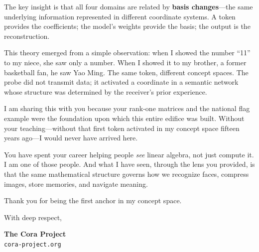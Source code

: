 \documentclass[11pt, a4paper]{article}
\begin{document}
The key insight is that all four domains are related by \textbf{basis changes}---the same underlying information represented in different coordinate systems. A token provides the coefficients; the model's weights provide the basis; the output is the reconstruction.

This theory emerged from a simple observation: when I showed the number ``11'' to my niece, she saw only a number. When I showed it to my brother, a former basketball fan, he saw Yao Ming. The same token, different concept spaces. The probe did not transmit data; it activated a coordinate in a semantic network whose structure was determined by the receiver's prior experience.

I am sharing this with you because your rank-one matrices and the national flag example were the foundation upon which this entire edifice was built. Without your teaching---without that first token activated in my concept space fifteen years ago---I would never have arrived here.

You have spent your career helping people \textit{see} linear algebra, not just compute it. I am one of those people. And what I have seen, through the lens you provided, is that the same mathematical structure governs how we recognize faces, compress images, store memories, and navigate meaning.

Thank you for being the first anchor in my concept space.

With deep respect,

\textbf{The Cora Project} \\
\texttt{cora-project.org}
\end{document}
